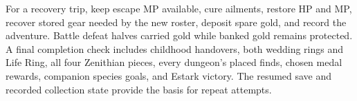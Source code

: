 For a recovery trip, keep escape MP available, cure ailments, restore HP and MP, recover stored gear needed by the new roster, deposit spare gold, and record the adventure. Battle defeat halves carried gold while banked gold remains protected. A final completion check includes childhood handovers, both wedding rings and Life Ring, all four Zenithian pieces, every dungeon's placed finds, chosen medal rewards, companion species goals, and Estark victory. The resumed save and recorded collection state provide the basis for repeat attempts.


